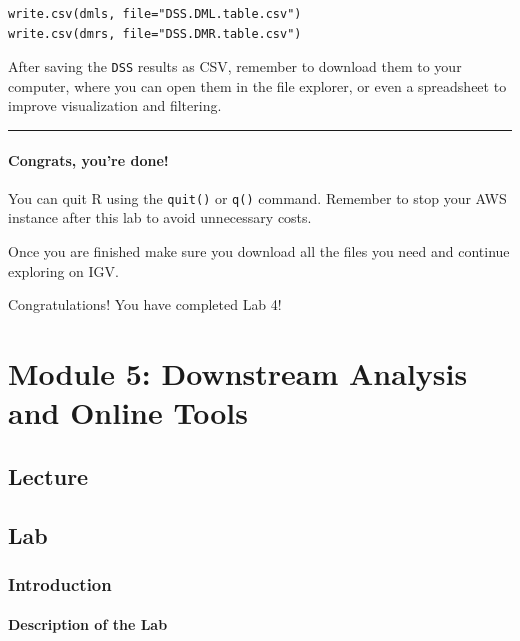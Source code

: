 \documentclass[
]{book}
\begin{document}
\begin{verbatim}
write.csv(dmls, file="DSS.DML.table.csv")
write.csv(dmrs, file="DSS.DMR.table.csv") 
\end{verbatim}

After saving the \texttt{DSS} results as CSV, remember to download them to your computer, where you can open them in the file explorer, or even a spreadsheet to improve visualization and filtering.

\begin{center}\rule{0.5\linewidth}{0.5pt}\end{center}

\subsubsection{Congrats, you're done!}\label{congrats-youre-done}

You can quit R using the \texttt{quit()} or \texttt{q()} command. Remember to stop your AWS instance after this lab to avoid unnecessary costs.

Once you are finished make sure you download all the files you need and continue exploring on IGV.

Congratulations! You have completed Lab 4!

\chapter{Module 5: Downstream Analysis and Online Tools}\label{module-5-downstream-analysis-and-online-tools}

\section{Lecture}\label{lecture-4}

\section{Lab}\label{lab-4}

\subsection{Introduction}\label{introduction-1}

\subsubsection{Description of the Lab}\label{description-of-the-lab-1}
\end{document}
